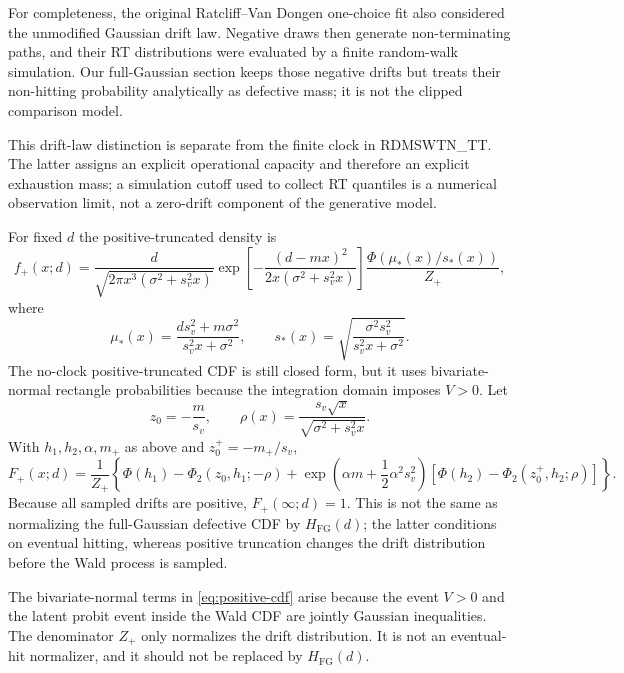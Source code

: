 \documentclass[12pt]{article}
\newcommand{\PhiN}{\Phi}
\newcommand{\PhiTwo}{\Phi_2}
\begin{document}
For completeness, the original Ratcliff--Van Dongen one-choice fit also considered the unmodified Gaussian drift law. Negative draws then generate non-terminating paths, and their RT distributions were evaluated by a finite random-walk simulation. Our full-Gaussian section keeps those negative drifts but treats their non-hitting probability analytically as defective mass; it is not the clipped comparison model.

This drift-law distinction is separate from the finite clock in RDMSWTN\_TT. The latter assigns an explicit operational capacity and therefore an explicit exhaustion mass; a simulation cutoff used to collect RT quantiles is a numerical observation limit, not a zero-drift component of the generative model.

For fixed $d$ the positive-truncated density is
\begin{equation}
  f_+(x;d)=
  \frac{d}{\sqrt{2\pi x^3(\sigma^2+s_v^2x)}}
  \exp\!\left[-\frac{(d-mx)^2}{2x(\sigma^2+s_v^2x)}\right]
  \frac{\PhiN\!\left(\mu_*(x)/s_*(x)\right)}{Z_+},
  \label{eq:positive-density}
\end{equation}
where
\begin{equation}
  \mu_*(x)=\frac{d s_v^2+m\sigma^2}{s_v^2x+\sigma^2},
  \qquad
  s_*(x)=\sqrt{\frac{\sigma^2s_v^2}{s_v^2x+\sigma^2}}.
\end{equation}
The no-clock positive-truncated CDF is still closed form, but it uses bivariate-normal rectangle probabilities because the integration domain imposes $V>0$. Let
\begin{equation}
  z_0=-\frac{m}{s_v},
  \qquad
  \rho(x)=\frac{s_v\sqrt{x}}{\sqrt{\sigma^2+s_v^2x}}.
\end{equation}
With $h_1,h_2,\alpha,m_+$ as above and $z_0^+=-m_+/s_v$,
\begin{equation}
  F_+(x;d)=\frac{1}{Z_+}\left\{
  \PhiN(h_1)-\PhiTwo(z_0,h_1;-\rho)
  +\exp\!\left(\alpha m+\frac{1}{2}\alpha^2s_v^2\right)
  \left[\PhiN(h_2)-\PhiTwo(z_0^+,h_2;\rho)\right]
  \right\}.
  \label{eq:positive-cdf}
\end{equation}
Because all sampled drifts are positive, $F_+(\infty;d)=1$. This is not the same as normalizing the full-Gaussian defective CDF by $H_{\mathrm{FG}}(d)$; the latter conditions on eventual hitting, whereas positive truncation changes the drift distribution before the Wald process is sampled.

The bivariate-normal terms in \eqref{eq:positive-cdf} arise because the event $V>0$ and the latent probit event inside the Wald CDF are jointly Gaussian inequalities. The denominator $Z_+$ only normalizes the drift distribution. It is not an eventual-hit normalizer, and it should not be replaced by $H_{\mathrm{FG}}(d)$.
\end{document}
